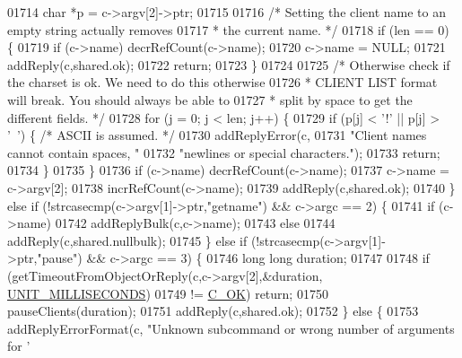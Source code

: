 \begin{DoxyCode}
{{{{{{{{{{{{{{{{{{{{01714         \textcolor{keywordtype}{char} *p = c->argv[2]->ptr;
01715 
01716         \textcolor{comment}{/* Setting the client name to an empty string actually removes}
01717 \textcolor{comment}{         * the current name. */}
01718         \textcolor{keywordflow}{if} (len == 0) \{
01719             \textcolor{keywordflow}{if} (c->name) decrRefCount(c->name);
01720             c->name = NULL;
01721             addReply(c,shared.ok);
01722             \textcolor{keywordflow}{return};
01723         \}
01724 
01725         \textcolor{comment}{/* Otherwise check if the charset is ok. We need to do this otherwise}
01726 \textcolor{comment}{         * CLIENT LIST format will break. You should always be able to}
01727 \textcolor{comment}{         * split by space to get the different fields. */}
01728         \textcolor{keywordflow}{for} (j = 0; j < len; j++) \{
01729             \textcolor{keywordflow}{if} (p[j] < \textcolor{stringliteral}{'!'} || p[j] > \textcolor{stringliteral}{'~'}) \{ \textcolor{comment}{/* ASCII is assumed. */}
01730                 addReplyError(c,
01731                     \textcolor{stringliteral}{"Client names cannot contain spaces, "}
01732                     \textcolor{stringliteral}{"newlines or special characters."});
01733                 \textcolor{keywordflow}{return};
01734             \}
01735         \}
01736         \textcolor{keywordflow}{if} (c->name) decrRefCount(c->name);
01737         c->name = c->argv[2];
01738         incrRefCount(c->name);
01739         addReply(c,shared.ok);
01740     \} \textcolor{keywordflow}{else} \textcolor{keywordflow}{if} (!strcasecmp(c->argv[1]->ptr,\textcolor{stringliteral}{"getname"}) && c->argc == 2) \{
01741         \textcolor{keywordflow}{if} (c->name)
01742             addReplyBulk(c,c->name);
01743         \textcolor{keywordflow}{else}
01744             addReply(c,shared.nullbulk);
01745     \} \textcolor{keywordflow}{else} \textcolor{keywordflow}{if} (!strcasecmp(c->argv[1]->ptr,\textcolor{stringliteral}{"pause"}) && c->argc == 3) \{
01746         \textcolor{keywordtype}{long} \textcolor{keywordtype}{long} duration;
01747 
01748         \textcolor{keywordflow}{if} (getTimeoutFromObjectOrReply(c,c->argv[2],&duration,
      \hyperlink{server_8h_a259de972533409a75b736bfc799a8e2d}{UNIT\_MILLISECONDS})
01749                                         != \hyperlink{server_8h_a303769ef1065076e68731584e758d3e1}{C\_OK}) \textcolor{keywordflow}{return};
01750         pauseClients(duration);
01751         addReply(c,shared.ok);
01752     \} \textcolor{keywordflow}{else} \{
01753         addReplyErrorFormat(c, \textcolor{stringliteral}{"Unknown subcommand or wrong number of arguments for '%
}}}}}}}}}}}}}}}}}}}}}
\end{DoxyCode}
